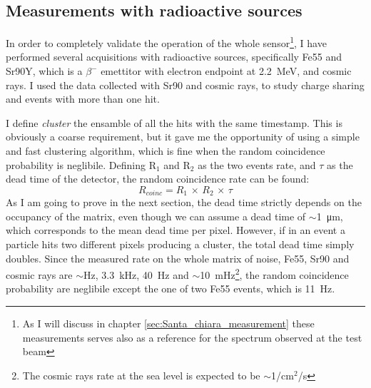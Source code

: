     \subsection{Measurements with radioactive sources}
        In order to completely validate the operation of the whole sensor\footnote{As I will discuss in chapter \ref{sec:Santa_chiara_measurement} these measurements serves also as a reference for the spectrum observed at the test beam}, I have performed several acquisitions with radioactive sources, specifically Fe55 and Sr90Y, which is a $\beta^-$ emettitor with electron endpoint at \SI{2.2}{MeV}, and cosmic rays.
        I used the data collected with Sr90 and cosmic rays, to study charge sharing and events with more than one hit.

        I define \emph{cluster} the ensamble of all the hits with the same timestamp. This is obviously a coarse requirement, but it gave me the opportunity of using a simple and fast clustering algorithm, which is fine when the random coincidence probability is neglibile. 
        Defining R$_1$ and R$_2$ as the two events rate, and $\tau$ as the dead time of the detector, the random coincidence rate can be found: 
        \begin{equation}
            R_{coinc} = R_1 \, \times\, R_2 \, \times \, \tau
        \end{equation}
        As I am going to prove in the next section, the dead time strictly depends on the occupancy of the matrix, even though we can assume a dead time of $\sim$\SI{1}{\um}, which corresponds to the mean dead time per pixel. However, if in an event a particle hits two different pixels producing a cluster, the total dead time simply doubles. 
        Since the measured rate on the whole matrix of noise, Fe55, Sr90 and cosmic rays are $\sim$\si{Hz}, \SI{3.3}{kHz}, \SI{40}{Hz} and $\sim$\SI{10}{mHz}\footnote{The cosmic rays rate at the sea level is expected to be $\sim$1/cm$^2$/s}, the random coincidence probability are neglibile except the one of two Fe55 events, which is \SI{11}{Hz}.
        
